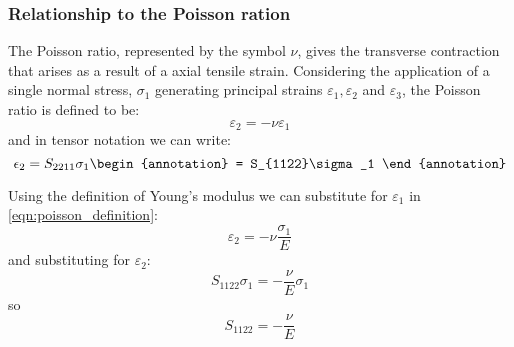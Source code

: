 \subsubsection{Relationship to the Poisson ration}

The Poisson ratio, represented by the symbol $\nu$, gives the transverse contraction that arises as a result of a axial tensile strain. Considering the application of a single normal stress, $\sigma_{1}$ generating principal strains $\varepsilon_1, \varepsilon_2$ and $\varepsilon_3$, the Poisson ratio is defined to be:
\begin{equation}
\varepsilon_2 = -\nu \varepsilon_1 \label{eqn:poisson_definition}
\end{equation}
and in tensor notation we can write:
\begin{equation}
\epsilon_2 = S_{2211}\sigma_1 \begin{annotation}
= S_{1122}\sigma_1
\end{annotation}
\end{equation}

Using the definition of Young's modulus we can substitute for $\varepsilon_1$ in \autoref{eqn:poisson_definition}:
\begin{equation}
\varepsilon_2 = -\nu \frac{\sigma_1}{E}
\end{equation}
and substituting for $\varepsilon_2$:
\begin{equation}
S_{1122} \sigma_1 = -\frac{\nu}{E} \sigma_1
\end{equation}
so
\begin{equation}
S_{1122} = -\frac{\nu}{E}
\end{equation}

